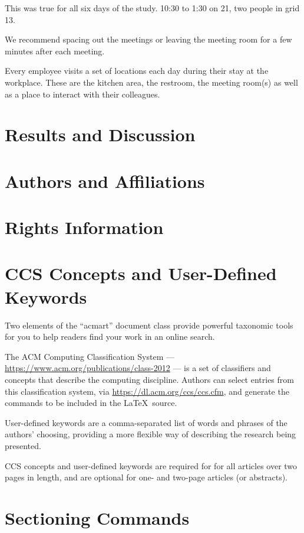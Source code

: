 \documentclass[acmtog]{acmart}
\begin{document}
This was true for all six days of the study. 10:30 to 1:30 on 21, two people in grid 13. 

We recommend spacing out the meetings or leaving the meeting room for a few minutes after each meeting.

Every employee visits a set of locations each day during their stay at the workplace. These are the kitchen area, the restroom, the meeting room(s) as well as a place to interact with their colleagues. 


\section{Results and Discussion}



\section{Authors and Affiliations}



\section{Rights Information}



\section{CCS Concepts and User-Defined Keywords}

Two elements of the ``acmart'' document class provide powerful
taxonomic tools for you to help readers find your work in an online
search.

The ACM Computing Classification System ---
\url{https://www.acm.org/publications/class-2012} --- is a set of
classifiers and concepts that describe the computing
discipline. Authors can select entries from this classification
system, via \url{https://dl.acm.org/ccs/ccs.cfm}, and generate the
commands to be included in the \LaTeX\ source.

User-defined keywords are a comma-separated list of words and phrases
of the authors' choosing, providing a more flexible way of describing
the research being presented.

CCS concepts and user-defined keywords are required for for all
articles over two pages in length, and are optional for one- and
two-page articles (or abstracts).

\section{Sectioning Commands}
\end{document}
